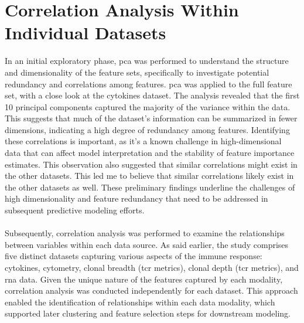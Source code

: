 \documentclass[12pt,a4paper]{report}
\begin{document}
\section{Correlation Analysis Within Individual Datasets}
\label{sec:correlation_analysis_within_individual_datasets}
\noindent
In an initial exploratory phase, \acrfull{pca} was performed to understand the structure and dimensionality of the feature sets, specifically to investigate potential redundancy and correlations among features. \gls{pca} was applied to the full feature set, with a close look at the cytokines dataset. The analysis revealed that the first 10 principal components captured the majority of the variance within the data. This suggests that much of the dataset's information can be summarized in fewer dimensions, indicating a high degree of redundancy among features. Identifying these correlations is important, as it's a known challenge in high-dimensional data that can affect model interpretation and the stability of feature importance estimates. This observation also suggested that similar correlations might exist in the other datasets. This led me to believe that similar correlations likely exist in the other datasets as well. These preliminary findings underline the challenges of high dimensionality and feature redundancy  that need to be addressed in subsequent predictive modeling efforts.\\
\\
Subsequently, correlation analysis was performed to examine the relationships between variables within each data source. As said earlier, the study comprises five distinct datasets capturing various aspects of the immune response: cytokines, cytometry, clonal breadth (\gls{tcr} metrics), clonal depth (\gls{tcr} metrics), and \acrshort{rna} data. Given the unique nature of the features captured by each modality, correlation analysis was conducted independently for each dataset. This approach enabled the identification of relationships within each data modality, which supported later clustering and feature selection steps for downstream modeling.
\end{document}
